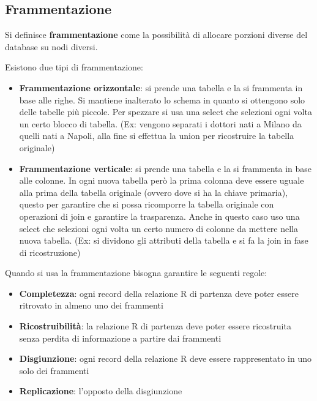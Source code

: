 \subsection{Frammentazione}
\begin{definizione}
      Si definisce \textbf{frammentazione} come la possibilità di allocare porzioni
      diverse del database su nodi diversi.
\end{definizione}
Esistono due tipi di frammentazione:
\begin{itemize}
      \item \textbf{Frammentazione orizzontale}: si prende una tabella e la si
            frammenta in base alle righe. Si mantiene inalterato lo schema in
            quanto si ottengono solo delle tabelle più piccole. Per spezzare si
            usa una select che selezioni ogni volta un certo blocco di tabella.
            (Ex: vengono separati i dottori nati a Milano da quelli nati a Napoli,
            alla fine si effettua la union per ricostruire la tabella originale)
      \item \textbf{Frammentazione verticale}: si prende una tabella e la si frammenta
            in base alle colonne. In ogni nuova tabella però la prima colonna
            deve essere uguale alla prima della tabella originale (ovvero dove si
            ha la chiave primaria), questo per garantire che si possa ricomporre
            la tabella originale con operazioni di join e garantire la
            trasparenza. Anche in questo caso uso una select che selezioni ogni
            volta un certo numero di colonne da mettere nella nuova tabella.
            (Ex: si dividono gli attributi della tabella e si fa la join in fase di
            ricostruzione)
\end{itemize}
Quando si usa la frammentazione bisogna garantire le seguenti regole:
\begin{itemize}
      \item \textbf{Completezza}: ogni record della relazione R di partenza
            deve poter essere ritrovato in almeno uno dei frammenti
      \item \textbf{Ricostruibilità}: la relazione R di partenza deve poter essere
            ricostruita senza perdita di informazione a partire dai frammenti
      \item \textbf{Disgiunzione}: ogni record della relazione R deve essere
            rappresentato in uno solo dei frammenti
      \item \textbf{Replicazione}: l'opposto della disgiunzione
\end{itemize}

